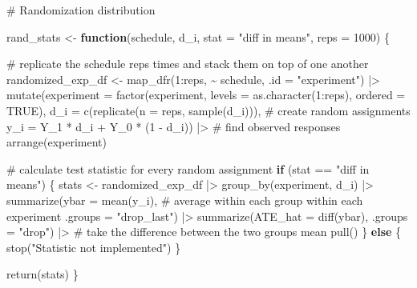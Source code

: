 \documentclass[
  letterpaper,
  DIV=11,
  numbers=noendperiod]{scrartcl}
\newenvironment{Shaded}{\begin{snugshade}}{\end{snugshade}}
\newcommand{\AttributeTok}[1]{\textcolor[rgb]{0.40,0.45,0.13}{#1}}
\newcommand{\CommentTok}[1]{\textcolor[rgb]{0.37,0.37,0.37}{#1}}
\newcommand{\ConstantTok}[1]{\textcolor[rgb]{0.56,0.35,0.01}{#1}}
\newcommand{\ControlFlowTok}[1]{\textcolor[rgb]{0.00,0.23,0.31}{\textbf{#1}}}
\newcommand{\DecValTok}[1]{\textcolor[rgb]{0.68,0.00,0.00}{#1}}
\newcommand{\FunctionTok}[1]{\textcolor[rgb]{0.28,0.35,0.67}{#1}}
\newcommand{\NormalTok}[1]{\textcolor[rgb]{0.00,0.23,0.31}{#1}}
\newcommand{\OtherTok}[1]{\textcolor[rgb]{0.00,0.23,0.31}{#1}}
\newcommand{\SpecialCharTok}[1]{\textcolor[rgb]{0.37,0.37,0.37}{#1}}
\newcommand{\StringTok}[1]{\textcolor[rgb]{0.13,0.47,0.30}{#1}}
\begin{document}
\begin{Shaded}
\begin{Highlighting}[]
\CommentTok{\# Randomization distribution}

\NormalTok{rand\_stats }\OtherTok{\textless{}{-}} \ControlFlowTok{function}\NormalTok{(schedule, d\_i, }\AttributeTok{stat =} \StringTok{"diff in means"}\NormalTok{, }\AttributeTok{reps =} \DecValTok{1000}\NormalTok{) \{}

  \CommentTok{\# replicate the schedule reps times and stack them on top of one another}
\NormalTok{  randomized\_exp\_df }\OtherTok{\textless{}{-}} \FunctionTok{map\_dfr}\NormalTok{(}\DecValTok{1}\SpecialCharTok{:}\NormalTok{reps, }\SpecialCharTok{\textasciitilde{}}\NormalTok{ schedule, }\AttributeTok{.id =} \StringTok{"experiment"}\NormalTok{) }\SpecialCharTok{|\textgreater{}}
    \FunctionTok{mutate}\NormalTok{(}\AttributeTok{experiment =} \FunctionTok{factor}\NormalTok{(experiment, }\AttributeTok{levels =} \FunctionTok{as.character}\NormalTok{(}\DecValTok{1}\SpecialCharTok{:}\NormalTok{reps), }\AttributeTok{ordered =} \ConstantTok{TRUE}\NormalTok{),}
           \AttributeTok{d\_i =} \FunctionTok{c}\NormalTok{(}\FunctionTok{replicate}\NormalTok{(}\AttributeTok{n =}\NormalTok{ reps, }\FunctionTok{sample}\NormalTok{(d\_i))),  }\CommentTok{\# create random assignments}
           \AttributeTok{y\_i =}\NormalTok{ Y\_1 }\SpecialCharTok{*}\NormalTok{ d\_i }\SpecialCharTok{+}\NormalTok{  Y\_0 }\SpecialCharTok{*}\NormalTok{ (}\DecValTok{1} \SpecialCharTok{{-}}\NormalTok{ d\_i)) }\SpecialCharTok{|\textgreater{}}    \CommentTok{\# find observed responses}
    \FunctionTok{arrange}\NormalTok{(experiment)}

  \CommentTok{\# calculate test statistic for every random assignment}
  \ControlFlowTok{if}\NormalTok{ (stat }\SpecialCharTok{==} \StringTok{"diff in means"}\NormalTok{) \{}
\NormalTok{    stats }\OtherTok{\textless{}{-}}\NormalTok{ randomized\_exp\_df }\SpecialCharTok{|\textgreater{}}
      \FunctionTok{group\_by}\NormalTok{(experiment, d\_i) }\SpecialCharTok{|\textgreater{}}
      \FunctionTok{summarize}\NormalTok{(}\AttributeTok{ybar =} \FunctionTok{mean}\NormalTok{(y\_i),     }\CommentTok{\# average within each group within each experiment}
                \AttributeTok{.groups =} \StringTok{"drop\_last"}\NormalTok{) }\SpecialCharTok{|\textgreater{}} 
      \FunctionTok{summarize}\NormalTok{(}\AttributeTok{ATE\_hat =} \FunctionTok{diff}\NormalTok{(ybar),}
                \AttributeTok{.groups =} \StringTok{"drop"}\NormalTok{) }\SpecialCharTok{|\textgreater{}}   \CommentTok{\# take the difference between the two groups mean }
      \FunctionTok{pull}\NormalTok{()}
\NormalTok{  \} }\ControlFlowTok{else}\NormalTok{ \{}
    \FunctionTok{stop}\NormalTok{(}\StringTok{"Statistic not implemented"}\NormalTok{)}
\NormalTok{  \}}

  \FunctionTok{return}\NormalTok{(stats)}
\NormalTok{\}}
\end{Highlighting}
\end{Shaded}
\end{document}
